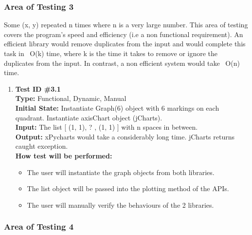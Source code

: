 \documentclass[12pt, titlepage]{article}
\begin{document}
\subsubsection{Area of Testing 3}
Some (x, y) repeated n times where n is a very large number. 
This area of testing covers the program's speed and efficiency (i.e a non functional requirement).
An efficient library would remove duplicates from the input and would complete this task in ~O(k) time, where k is the time it takes to remove or ignore the duplicates from the input. In contrast, a non efficient system would take ~O(n) time.		
		\begin{enumerate}
			\item{\textbf{Test ID \#3.1\\}}
			\textbf{Type:} Functional, Dynamic, Manual\\
			\textbf{Initial State:} Instantiate Graph(6) object with 6 markings on each quadrant. Instantiate axisChart object (jCharts).\\	
			\textbf{Input:} The list [ (1, 1), ? , (1, 1) ] with n spaces in between. \\
			\textbf{Output:}   xPycharts would take a considerably long time. jCharts returns caught exception. \\
			\textbf{How test will be performed:}
				\begin{itemize}[label={--}]
					\item The user will instantiate the graph objects from both libraries. 
					\item The list object will be passed into the plotting method of the APIs.
					\item The user will manually verify the behaviours of the 2 libraries.
				\end{itemize}					
	\end{enumerate}
\subsubsection{Area of Testing 4}
\end{document}

